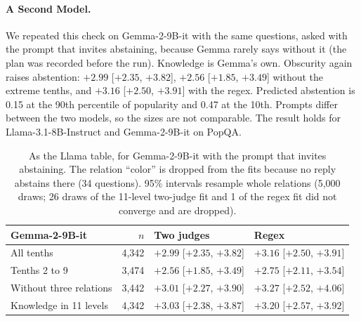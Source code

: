 \paragraph{A Second Model.} We repeated this check on Gemma-2-9B-it with the same questions, asked with the prompt that invites abstaining, because Gemma rarely says \idk{} without it (the plan was recorded before the run). Knowledge is Gemma's own. Obscurity again raises abstention: $+2.99$ [$+2.35$, $+3.82$], $+2.56$ [$+1.85$, $+3.49$] without the extreme tenths, and $+3.16$ [$+2.50$, $+3.91$] with the regex. Predicted abstention is 0.15 at the 90th percentile of popularity and 0.47 at the 10th. Prompts differ between the two models, so the sizes are not comparable. The result holds for Llama-3.1-8B-Instruct and Gemma-2-9B-it on PopQA.

\begin{table}[h]
\centering
\small\setlength{\tabcolsep}{3pt}
\begin{tabular}{lrll}
\toprule
Gemma-2-9B-it & $n$ & Two judges & Regex \\
\midrule
All tenths & 4{,}342 & $+2.99$ [$+2.35$, $+3.82$] & $+3.16$ [$+2.50$, $+3.91$] \\
Tenths 2 to 9 & 3{,}474 & $+2.56$ [$+1.85$, $+3.49$] & $+2.75$ [$+2.11$, $+3.54$] \\
Without three relations & 3{,}442 & $+3.01$ [$+2.27$, $+3.90$] & $+3.27$ [$+2.52$, $+4.06$] \\
Knowledge in 11 levels & 4{,}342 & $+3.03$ [$+2.38$, $+3.87$] & $+3.20$ [$+2.57$, $+3.92$] \\
\bottomrule
\end{tabular}
\caption{As the Llama table, for Gemma-2-9B-it with the prompt that invites abstaining. The relation ``color'' is dropped from the fits because no reply abstains there (34 questions). 95\% intervals resample whole relations (5,000 draws; 26 draws of the 11-level two-judge fit and 1 of the regex fit did not converge and are dropped).}
\label{tab:gemmarange}
\end{table}
